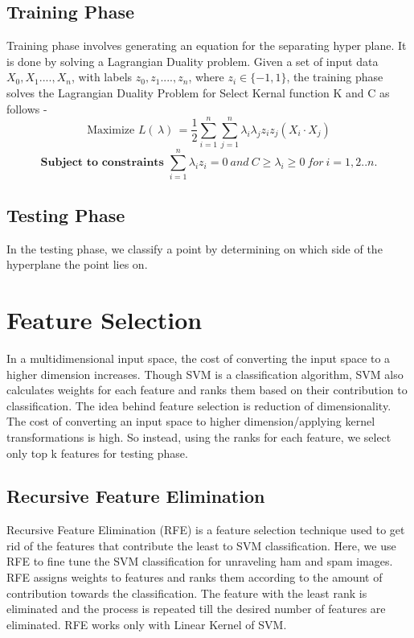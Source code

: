 \subsection{Training Phase}

\par Training phase involves generating an equation for the separating hyper plane. It is done by solving a Lagrangian Duality problem. Given a set of input data $X_{0}, X_{1}...., X_{n}$, with labels $z_{0}, z_{1}...., z_{n}$, where $z_{i} \in \{-1, 1\}$, the training phase solves the Lagrangian Duality Problem for Select Kernal function K and C as follows - 
	\[ \text{Maximize } L( \,\lambda) \, = \frac{1}{2} \sum\limits_{i=1}^{n}\sum\limits_{j=1}^{n} \lambda_{i}\lambda_{j} z_{i} z_{j} (X_{i} \cdot X_{j})\] 
	\[\textbf{Subject to constraints } \sum\limits_{i=1}^{n}\lambda_{i}z_{i} = 0 ~and~ C \geq \lambda_{i} \geq 0 ~for~ i=1,2..n.\] 
\subsection{Testing Phase}
\par In the testing phase, we classify a point by determining on which side of the hyperplane the point lies on.

\section{Feature Selection}
\par In a multidimensional  input space, the cost of converting the input space to a higher dimension increases. Though SVM is a classification algorithm, SVM also calculates weights for each feature and ranks them based on their contribution to classification. The idea behind feature selection is reduction of dimensionality. The cost of converting an input space to higher dimension/applying kernel transformations is high. So instead, using the ranks for each feature, we select only top k features for testing phase.


\subsection{Recursive Feature Elimination}

\par Recursive Feature Elimination (RFE) is a feature selection technique used to get rid of the features that contribute the least to SVM classification. Here, we use RFE to fine tune the SVM classification for unraveling ham and spam images. RFE assigns weights to features and ranks them according to the amount of contribution towards the classification. The feature with the least rank is eliminated and the process is repeated till the desired number of features are eliminated. RFE works only with Linear Kernel of SVM.

